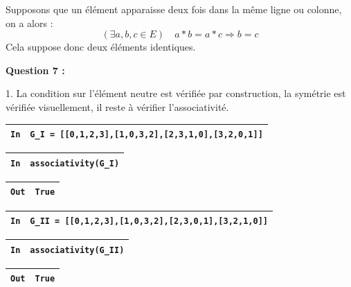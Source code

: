 \documentclass[titlepage]{article}
\begin{document}
    Supposons que un élément apparaisse deux fois dans la même ligne ou colonne, on a alors :
    \[(\exists a, b, c \in E) \quad a*b=a*c \Longrightarrow b = c\]
    Cela suppose donc deux éléments identiques.\newline

    \textbf{Question 7 :}

    1. La condition sur l'élément neutre est vérifiée par construction, la symétrie est vérifiée visuellement, il reste à vérifier l'associativité.\newline
    
    \begin{tabularx}{11.5cm}{|p{0.60cm}|X|}
        \hline
        \verb|In|
        & 
        \verb|G_I = [[0,1,2,3],[1,0,3,2],[2,3,1,0],[3,2,0,1]]|
        \\
        \hline
    \end{tabularx}\newline
    \begin{tabularx}{11.5cm}{|p{0.60cm}|X|}
        \hline
        \verb|In|
        & 
        \verb|associativity(G_I)|
        \\
        \hline
    \end{tabularx}\newline
    \begin{tabularx}{11.5cm}{|p{0.60cm}|X|}
        \hline
        \verb|Out|
        & 
        \verb|True|
        \\
        \hline
    \end{tabularx}\newline\newline

    \begin{tabularx}{11.5cm}{|p{0.60cm}|X|}
        \hline
        \verb|In|
        & 
        \verb|G_II = [[0,1,2,3],[1,0,3,2],[2,3,0,1],[3,2,1,0]]|
        \\
        \hline
    \end{tabularx}\newline
    \begin{tabularx}{11.5cm}{|p{0.60cm}|X|}
        \hline
        \verb|In|
        & 
        \verb|associativity(G_II)|
        \\
        \hline
    \end{tabularx}\newline
    \begin{tabularx}{11.5cm}{|p{0.60cm}|X|}
        \hline
        \verb|Out|
        & 
        \verb|True|
        \\
        \hline
    \end{tabularx}\newline\newline
\end{document}
